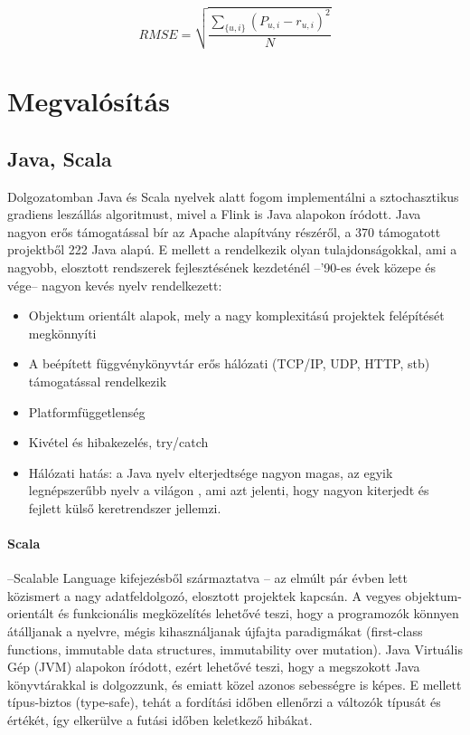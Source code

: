 \documentclass[a4paper,12pt]{article}
\begin{document}
\[RMSE =   \sqrt{\frac{ \sum_{\{u,i\}} (P_{u,i} - r_{u,i})^2}{N}}\] 

\section{Megvalósítás}

\subsection{Java, Scala}
Dolgozatomban Java és Scala nyelvek alatt fogom implementálni a sztochasztikus gradiens leszállás algoritmust, mivel a Flink is Java alapokon íródott. Java nagyon erős támogatással bír az Apache alapítvány részéről, a 370 támogatott projektből 222 Java alapú. \cite{asf} E mellett a rendelkezik olyan tulajdonságokkal, ami a nagyobb, elosztott rendszerek fejlesztésének kezdeténél --'90-es évek közepe és vége-- nagyon kevés nyelv rendelkezett:
\begin{itemize}
\item Objektum orientált alapok, mely a nagy komplexitású projektek felépítését megkönnyíti
\item A beépített függvénykönyvtár erős hálózati (TCP/IP, UDP, HTTP, stb) támogatással rendelkezik
\item Platformfüggetlenség
\item Kivétel és hibakezelés, try/catch
\item Hálózati hatás: a Java nyelv elterjedtsége nagyon magas, az egyik legnépszerűbb nyelv a világon \cite{tiobe}, ami azt jelenti, hogy nagyon kiterjedt és fejlett külső keretrendszer jellemzi.
\end{itemize}

\paragraph{Scala}\hspace*{-0.3cm}--Scalable Language kifejezésből származtatva \cite{odersky}-- az elmúlt pár évben lett közismert a nagy adatfeldolgozó, elosztott projektek kapcsán. A vegyes objektum-orientált és funkcionális megközelítés lehetővé teszi, hogy a programozók könnyen átálljanak a nyelvre, mégis kihasználjanak újfajta paradigmákat (first-class functions, immutable data structures, immutability over mutation). Java Virtuális Gép (JVM) alapokon íródott, ezért lehetővé teszi, hogy a megszokott Java könyvtárakkal is dolgozzunk, és emiatt közel azonos sebességre is képes.  E mellett típus-biztos (type-safe), tehát a fordítási időben ellenőrzi a változók típusát és értékét, így elkerülve a futási időben keletkező hibákat\cite{toptal}. 
\end{document}
